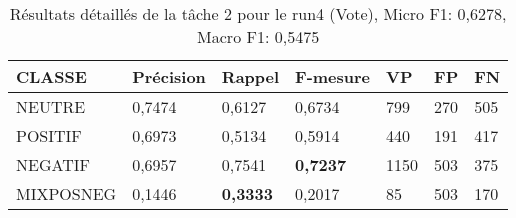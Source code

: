 \begin{table}[htbp]
  \begin{center}
    \begin{tabular}{l|l|l|l|l|l|l}
  CLASSE	&Précision	&Rappel	&F-mesure	&VP	&FP	&FN\\
\hline
  NEUTRE	&0,7474	&0,6127	&0,6734	&799	&270	&505\\
  POSITIF	&0,6973	&0,5134	&0,5914	&440	&191	&417\\
  NEGATIF	&0,6957	&0,7541	&\textbf{0,7237}	&1150	&503	&375\\
  MIXPOSNEG	&0,1446	&\textbf{0,3333}	&0,2017	&85	&503	&170\\
\hline
\end{tabular}
\caption{Résultats détaillés de la tâche 2 pour le run4 (Vote),
  Micro F1: 0,6278, Macro F1: 0,5475\label{tab:detail4}}
\end{center}
\end{table}
